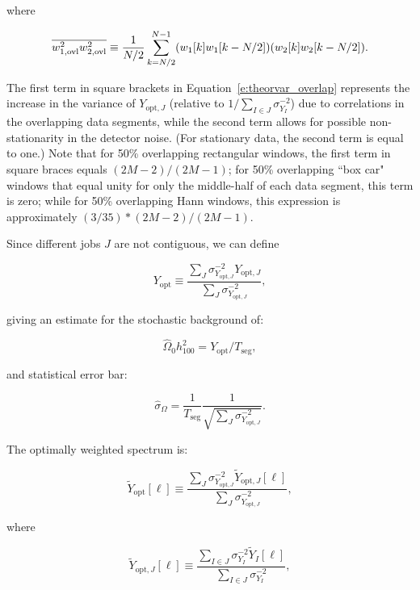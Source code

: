 where

\begin{equation}
\overline{w_{1,{\rm ovl}}^2 w_{2,{\rm ovl}}^2} \equiv
\frac{1}{N/2}\sum_{k=N/2}^{N-1} (w_1[k] w_1[k-N/2]) (w_2[k] w_2[k-N/2]).
\end{equation}

The first term in square brackets in Equation~\ref{e:theorvar_overlap}
represents the increase in the variance of $Y_{\mathrm{opt}, J}$
(relative to $1/{\sum_{I \in J} \sigma_{Y_{I}}^{-2}}$) due to
correlations in the overlapping data segments, while the second term
allows for possible non-stationarity in the detector noise. (For
stationary data, the second term is equal to one.) Note that for 50\%
overlapping rectangular windows, the first term in square braces equals
$(2M-2)/(2M-1)$; for 50\% overlapping ``box car" windows that equal
unity for only the middle-half of each data segment, this term is zero;
while for 50\% overlapping Hann windows, this expression is
approximately $(3/35)*(2M-2)/(2M-1)$.

Since different jobs $J$ are not contiguous, we can define

\begin{equation}
Y_{\mathrm{opt}} \equiv \frac{\sum_J \sigma_{Y_{\mathrm{opt}, J}}^{-2}
Y_{\mathrm{opt}, J}}{\sum_J \sigma_{Y_{\mathrm{opt}, J}}^{-2}},
\end{equation}

giving an estimate for the stochastic background of:

\begin{equation}
\widehat \Omega_0 h^2_{100} = Y_{\mathrm{opt}}/T_{\mathrm{seg}},
\end{equation}

and statistical error bar:

\begin{equation}
\widehat \sigma_{\Omega} = \frac{1}{T_{\mathrm{seg}}}
\frac{1}{\sqrt{\sum_J \sigma_{Y_{\mathrm{opt}, J}}^{-2}}}.
\end{equation}

The optimally weighted spectrum is:

\begin{equation}
\widetilde Y_{\mathrm{opt}}[\ell] \equiv \frac{\sum_J
\sigma_{Y_{\mathrm{opt}, J}}^{-2} \widetilde Y_{\mathrm{opt},
	J}[\ell]}{\sum_J \sigma_{Y_{\mathrm{opt}, J}}^{-2}},
\end{equation}

where

\begin{equation}
\widetilde Y_{\mathrm{opt}, J}[\ell] \equiv \frac{\sum_{I \in J}
\sigma_{Y_{I}}^{-2} \widetilde Y_{I}[\ell]}{\sum_{I \in J}
\sigma_{Y_{I}}^{-2}},
\end{equation}

